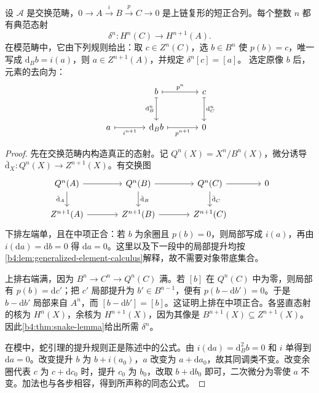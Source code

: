 \begin{proposition}\label{b4:prop:connecting-map-construction}
设 \(\mathcal A\) 是交换范畴，\(0\to A\xrightarrow{i}B\xrightarrow{p}C\to0\) 是上链复形的短正合列。每个整数 \(n\) 都有典范态射
\[
\delta^n:H^n(C)\longrightarrow H^{n+1}(A).
\]
在模范畴中，它由下列规则给出：取 \(c\in Z^n(C)\)，选 \(b\in B^n\) 使 \(p(b)=c\)，唯一写成 \(\mathrm{d}_Bb=i(a)\)，则 \(a\in Z^{n+1}(A)\)，并规定 \(\delta^n[c]=[a]\)。
选定原像 \(b\) 后，元素的去向为：
\[
\begin{tikzcd}[column sep=large,row sep=large]
&b\arrow[r,mapsto,"p^n"]\arrow[d,mapsto,"\mathrm{d}_B^n"']&c\arrow[d,mapsto,"\mathrm{d}_C^n"]\\
a\arrow[r,mapsto,"i^{n+1}"']&\mathrm{d}_Bb\arrow[r,mapsto,"p^{n+1}"']&0
\end{tikzcd}
\]
\end{proposition}
\begin{proof}
先在交换范畴内构造真正的态射。记 \(Q^n(X)=X^n/B^n(X)\)，微分诱导 \(\bar{\mathrm{d}}_X:Q^n(X)\to Z^{n+1}(X)\)。有交换图
\[
\begin{tikzcd}[column sep=large]
Q^n(A)\arrow[r]\arrow[d,"\bar{\mathrm{d}}_A"']&Q^n(B)\arrow[r]\arrow[d,"\bar{\mathrm{d}}_B"]&Q^n(C)\arrow[r]\arrow[d,"\bar{\mathrm{d}}_C"]&0\\
Z^{n+1}(A)\arrow[r]&Z^{n+1}(B)\arrow[r]&Z^{n+1}(C)&
\end{tikzcd}
\]
下排左端单，且在中项正合：若 \(b\) 为余圈且 \(p(b)=0\)，则局部写成 \(i(a)\)，再由 \(i(\mathrm{d}a)=\mathrm{d}b=0\) 得 \(\mathrm{d}a=0\)。这里以及下一段中的局部提升均按\cref{b4:lem:generalized-element-calculus}解释，故不需要对象带底集合。

上排右端满，因为 \(B^n\to C^n\to Q^n(C)\) 满。若 \([b]\) 在 \(Q^n(C)\) 中为零，则局部有 \(p(b)=\mathrm{d}c'\)；把 \(c'\) 局部提升为 \(b'\in B^{n-1}\)，便有 \(p(b-\mathrm{d}b')=0\)。于是 \(b-\mathrm{d}b'\) 局部来自 \(A^n\)，而 \([b-\mathrm{d}b']=[b]\)。这证明上排在中项正合。各竖直态射的核为 \(H^n(X)\)，余核为 \(H^{n+1}(X)\)，因为其像是 \(B^{n+1}(X)\subseteq Z^{n+1}(X)\)。因此\cref{b4:thm:snake-lemma}给出所需 \(\delta^n\)。

在模中，蛇引理的提升规则正是陈述中的公式。由 \(i(\mathrm{d}a)=\mathrm{d}_B^2b=0\) 和 \(i\) 单得到 \(\mathrm{d}a=0\)。改变提升 \(b\) 为 \(b+i(a_0)\)，\(a\) 改变为 \(a+\mathrm{d}a_0\)，故其同调类不变。改变余圈代表 \(c\) 为 \(c+\mathrm{d}c_0\) 时，提升 \(c_0\) 为 \(b_0\)，改取 \(b+\mathrm{d}b_0\) 即可，二次微分为零使 \(a\) 不变。加法也与各步相容，得到所声称的同态公式。
\end{proof}

